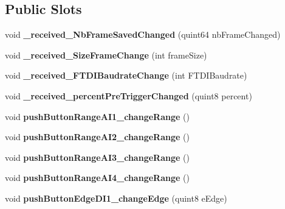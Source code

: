 \subsection*{Public Slots}
\begin{DoxyCompactItemize}
\item 
\mbox{\label{class_setting_window_abf2b227f7289906e855b5d66df2e1404}} 
void {\bfseries \+\_\+received\+\_\+\+Nb\+Frame\+Saved\+Changed} (quint64 nb\+Frame\+Changed)
\item 
\mbox{\label{class_setting_window_a079d34430e765a54ba8e0720f65cef14}} 
void {\bfseries \+\_\+received\+\_\+\+Size\+Frame\+Change} (int frame\+Size)
\item 
\mbox{\label{class_setting_window_ad3db9b4fd4ab5d8bab031a72ba6496b1}} 
void {\bfseries \+\_\+received\+\_\+\+F\+T\+D\+I\+Baudrate\+Change} (int F\+T\+D\+I\+Baudrate)
\item 
\mbox{\label{class_setting_window_ada3b67de3f050425f09c1e1fff48f187}} 
void {\bfseries \+\_\+received\+\_\+percent\+Pre\+Trigger\+Changed} (quint8 percent)
\item 
\mbox{\label{class_setting_window_abfe9c05701ab2375096e9fc7a6005047}} 
void {\bfseries push\+Button\+Range\+A\+I1\+\_\+change\+Range} ()
\item 
\mbox{\label{class_setting_window_a2e528395dfba563ea8a71a0f1c3438ef}} 
void {\bfseries push\+Button\+Range\+A\+I2\+\_\+change\+Range} ()
\item 
\mbox{\label{class_setting_window_a117d530dc379d6d54f428e31e94fdffb}} 
void {\bfseries push\+Button\+Range\+A\+I3\+\_\+change\+Range} ()
\item 
\mbox{\label{class_setting_window_a00ceca61e68fc62c1e609af7c3fade97}} 
void {\bfseries push\+Button\+Range\+A\+I4\+\_\+change\+Range} ()
\item 
\mbox{\label{class_setting_window_ae758e4e762fb97f406d4e5a3d4408082}} 
void {\bfseries push\+Button\+Edge\+D\+I1\+\_\+change\+Edge} (quint8 e\+Edge)

\end{DoxyCompactItemize}
